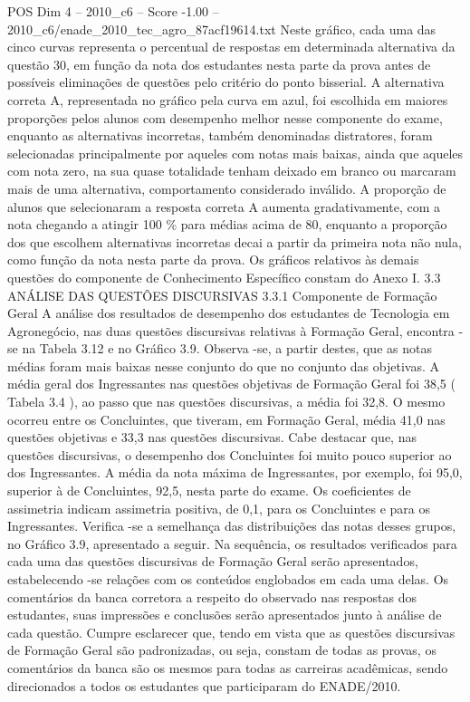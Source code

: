 \begin{textsample}{POS Dim 4 – 2010\_c6 – Score -1.00 – 2010\_c6/enade\_2010\_tec\_agro\_87acf19614.txt}
Neste gráfico, cada uma das cinco curvas representa o percentual de respostas em determinada alternativa da questão 30, em função da nota dos estudantes nesta parte da prova antes de possíveis eliminações de questões pelo critério do ponto bisserial.
A alternativa correta A, representada no gráfico pela curva em azul, foi escolhida em maiores proporções pelos alunos com desempenho melhor nesse componente do exame, enquanto as alternativas incorretas, também denominadas distratores, foram selecionadas principalmente por aqueles com notas mais baixas, ainda que aqueles com nota zero, na sua quase totalidade tenham deixado em branco ou marcaram mais de uma alternativa, comportamento considerado inválido.
A proporção de alunos que selecionaram a resposta correta A aumenta gradativamente, com a nota chegando a atingir 100 \% para médias acima de 80, enquanto a proporção dos que escolhem alternativas incorretas decai a partir da primeira nota não nula, como função da nota nesta parte da prova.
Os gráficos relativos às demais questões do componente de Conhecimento Específico constam do Anexo I. 3.3 ANÁLISE DAS QUESTÕES DISCURSIVAS 3.3.1 Componente de Formação Geral A análise dos resultados de desempenho dos estudantes de Tecnologia em Agronegócio, nas duas questões discursivas relativas à Formação Geral, encontra -se na Tabela 3.12 e no Gráfico 3.9.
Observa -se, a partir destes, que as notas médias foram mais baixas nesse conjunto do que no conjunto das objetivas.
A média geral dos Ingressantes nas questões objetivas de Formação Geral foi 38,5 ( Tabela 3.4 ), ao passo que nas questões discursivas, a média foi 32,8.
O mesmo ocorreu entre os Concluintes, que tiveram, em Formação Geral, média 41,0 nas questões objetivas e 33,3 nas questões discursivas.
Cabe destacar que, nas questões discursivas, o desempenho dos Concluintes foi muito pouco superior ao dos Ingressantes.
A média da nota máxima de Ingressantes, por exemplo, foi 95,0, superior à de Concluintes, 92,5, nesta parte do exame.
Os coeficientes de assimetria indicam assimetria positiva, de 0,1, para os Concluintes e para os Ingressantes.
Verifica -se a semelhança das distribuições das notas desses grupos, no Gráfico 3.9, apresentado a seguir.
Na sequência, os resultados verificados para cada uma das questões discursivas de Formação Geral serão apresentados, estabelecendo -se relações com os conteúdos englobados em cada uma delas.
Os comentários da banca corretora a respeito do observado nas respostas dos estudantes, suas impressões e conclusões serão apresentados junto à análise de cada questão.
Cumpre esclarecer que, tendo em vista que as questões discursivas de Formação Geral são padronizadas, ou seja, constam de todas as provas, os comentários da banca são os mesmos para todas as carreiras acadêmicas, sendo direcionados a todos os estudantes que participaram do ENADE/2010.

\end{textsample}

